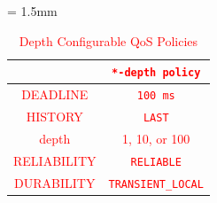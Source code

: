 \documentclass{sig-alternate-05-2015}
\begin{document}
\renewcommand{\arraystretch}{1.0}
\begin{table}[t]
  \caption{\label{tb:depth_qos}\textcolor{red}{Depth Configurable QoS Policies}}
  \centering
  \tabcolsep = 1.5mm              %
  \textcolor{red}{
  \begin{tabular}{c|c}
    \hline
    & \textbf{\texttt{*-depth policy} }\\
    \hline
    \hline
    DEADLINE & \texttt{100 ms}\\
    HISTORY & \texttt{LAST}\\
    depth & 1, 10, or 100\\
    RELIABILITY & \texttt{RELIABLE}\\
    DURABILITY & \texttt{TRANSIENT\_LOCAL}\\
    \hline
  \end{tabular}
  }
  \vspace{-5mm}
\end{table}
\end{document}
